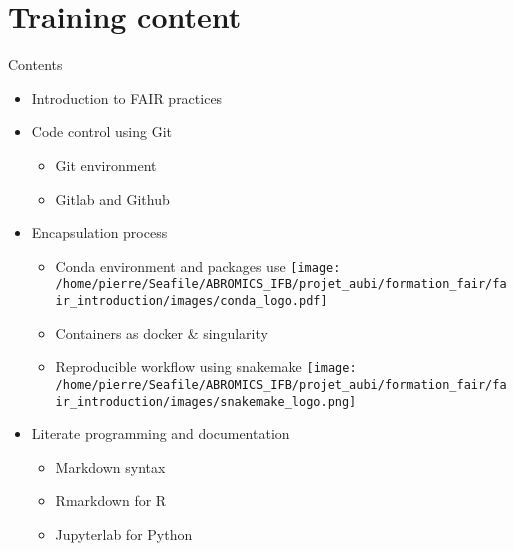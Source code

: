 \section{Training content}
\begin{frame}
\begin{block}{Contents}
\begin{itemize}
\item<1-> Introduction to FAIR practices
\item<2-> Code control using Git \faGit* 
	\begin{itemize}[<2->]
	\item Git environment
	\item Gitlab and Github \faGithub \faGitlab
	\end{itemize}
\item<3-> Encapsulation process
	\begin{itemize}[<3->]
	\item Conda environment and packages use \texttt{[image: /home/pierre/Seafile/ABROMICS\_IFB/projet\_aubi/formation\_fair/fair\_introduction/images/conda\_logo.pdf]}
	\item Containers as docker \& singularity \faDocker 
	\item Reproducible workflow using snakemake 	\texttt{[image: /home/pierre/Seafile/ABROMICS\_IFB/projet\_aubi/formation\_fair/fair\_introduction/images/snakemake\_logo.png]}
	\end{itemize}
\item<4-> Literate programming and documentation
	\begin{itemize}[<4->]
	\item Markdown syntax \faMarkdown
	\item Rmarkdown for R \faRProject 
	\item Jupyterlab for Python \faPython
	\end{itemize}
\end{itemize}
\end{block}
\end{frame}

